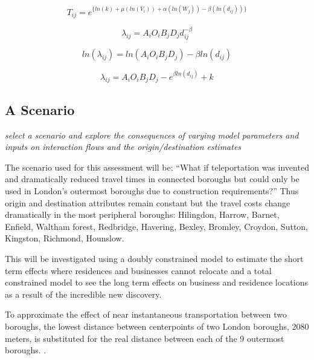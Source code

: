 \documentclass[11pt]{article} %
\begin{document}

\begin{equation}
T_{ij} = e^ { \{ ln(k) + \mu (ln(V_i)) +  \alpha( ln(W_j)) - \beta (ln(d_{ij})) \}}
\end{equation}


\begin{equation}
\lambda_{ij} = A_i O_i  B_j D_j d_{ij}^{-\beta}
\end{equation}

\begin{equation}
ln(\lambda_{ij}) = ln(A_i O_i  B_j D_j) - \beta ln( d_{ij})
\end{equation}


\begin{equation}
\lambda_{ij} = A_i O_i  B_j D_j - e ^{ \beta ln( d_{ij})} + k
\end{equation}



\subsection{A Scenario}

\textit{select a scenario and explore the consequences of varying model parameters and inputs on interaction flows and the origin/destination estimates}

The scenario used for this assessment will be: ``What if teleportation  was invented and dramatically reduced travel times in connected boroughs but could only be used in London's outermost boroughs due to construction requirements?'' Thus origin and destination attributes remain constant but the travel costs change dramatically in the most peripheral boroughs: Hilingdon, Harrow, Barnet, Enfield, Waltham forest, Redbridge, Havering, Bexley, Bromley, Croydon, Sutton, Kingston, Richmond, Hounslow. 

This will be investigated using a doubly constrained model to estimate the short term effects where residences and businesses cannot relocate and a total constrained model to see the long term effects on business and residence locations as a result of the incredible new discovery. 

To approximate the effect of near instantaneous transportation between two boroughs, the lowest distance between centerpoints of two London boroughs, 2080 meters, is substituted for the real distance between each of the 9 outermost boroughs. . 
\end{document}
